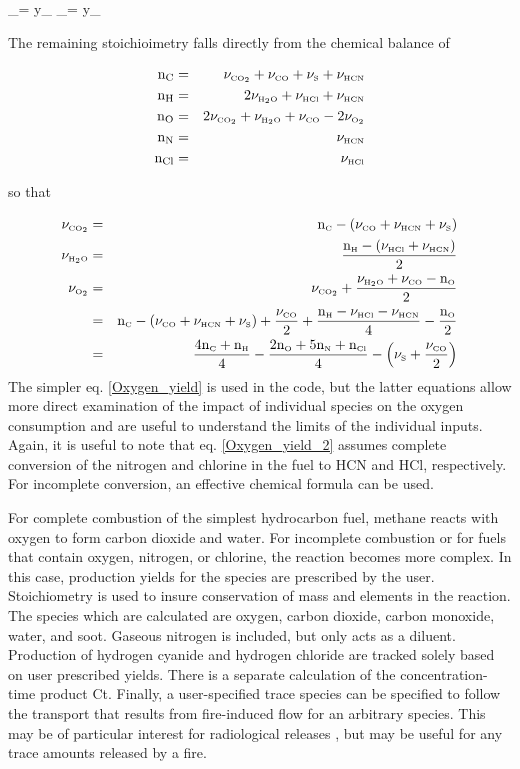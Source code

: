 \be
   \nu_\HCN =  \; y_\HCN \label{HCN_yield}
\ee
\be
   \nu_\HCl =  \; y_\HCl \label{HCl_yield}
\ee

The remaining stoichioimetry falls directly from the chemical balance of

\begin{eqnarray}
\mathrm{n_C} &=& \nu_{\tiny \hbox{CO}_2} + \nu_{\tiny \hbox{CO}} + \nu_{\tiny \hbox{S}} + \nu_{\tiny \hbox{HCN}} \\
\mathrm{n_H} &=& 2 \nu_{\tiny \hbox{H}_2\hbox{O}} + \nu_{\tiny \hbox{HCl}} + \nu_{\tiny \hbox{HCN}} \\
\mathrm{n_O} &=& 2 \nu_{\tiny \hbox{CO}_2} + \nu_{\tiny \hbox{H}_2\hbox{O}} + \nu_{\tiny \hbox{CO}} - 2 \nu_{\tiny \hbox{O}_2} \\
\mathrm{n_{N}} &=& \nu_{\tiny \hbox{HCN}} \\
\mathrm{n_{Cl}} &=& \nu_{\tiny \hbox{HCl}}
\end{eqnarray}

so that

\begin{eqnarray}
  \nu_{\tiny \hbox{CO}_2} &=& \mathrm{n_{\tiny \hbox{C}}} - { \left( {\nu_{\tiny \hbox{CO}} + \nu_{\tiny \hbox{HCN}} + \nu_{\tiny \hbox{S}}} \right) } \\
  \nu_{\tiny \hbox{H}_2\hbox{O}} &=& \frac{\mathrm{n_{\tiny \hbox{H}}} - { \left( {\nu_{\tiny \hbox{HCl}} + \nu_{\tiny \hbox{HCN}}} \right) }}{2} \\
 \nu_{\tiny \hbox{O}_2} &=& \nu_{\tiny \hbox{CO}_2} + \frac{\nu_{\tiny \hbox{H}_2\hbox{O}} + \nu_{\tiny \hbox{CO}} - \mathrm{n_{\tiny \hbox{O}}}}{2} \label{Oxygen_yield} \\
 &=& \mathrm{n_{\tiny \hbox{C}}} - { \left( {\nu_{\tiny \hbox{CO}} + \nu_{\tiny \hbox{HCN}} + \nu_{\tiny \hbox{S}}} \right) }+\frac{\nu_{\tiny \hbox{CO}}}{2}+\frac{\mathrm{n_{\tiny \hbox{H}}} - \nu_{\tiny \hbox{HCl}} - \nu_{\tiny \hbox{HCN}}}{4}-\frac{\mathrm{n_{\tiny \hbox{O}}}}{2} \\
 &=& \frac{4 \mathrm{n_{\tiny \hbox{C}}+n_{\tiny \hbox{H}}}}{4}-\frac{\mathrm{2 n_{\tiny \hbox{O}}+5 n_{\tiny \hbox{N}}+n_{\tiny \hbox{Cl}}}}{4}-{ \left( {\nu_{\tiny \hbox{S}}+\frac{\nu_{\tiny \hbox{CO}}}{2}} \right) } \label{Oxygen_yield_2}
\end{eqnarray}
The simpler eq. \ref{Oxygen_yield} is used in the code, but the latter equations allow more direct examination of the impact of individual species on the oxygen consumption and are useful to understand the limits of the individual inputs. Again, it is useful to note that eq. \ref{Oxygen_yield_2} assumes complete conversion of the nitrogen and chlorine in the fuel to HCN and HCl, respectively. For incomplete conversion, an effective chemical formula can be used.

For complete combustion of the simplest hydrocarbon fuel, methane reacts with
oxygen to form carbon dioxide and water. For incomplete combustion or for fuels that contain oxygen, nitrogen, or chlorine, the reaction becomes
more complex. In this case, production yields for the species are prescribed by the user.
Stoichiometry is used to insure conservation of mass and elements in the reaction. The species
which are calculated are oxygen, carbon dioxide, carbon monoxide, water, and soot. Gaseous nitrogen is included, but only acts as a diluent. Production of hydrogen cyanide and hydrogen chloride are tracked solely based on user prescribed yields. There is a separate calculation of the concentration-time product Ct. Finally, a user-specified trace species can be specified to follow the transport that results from fire-induced flow for an arbitrary species. This may be of particular interest for radiological releases \cite{Jones:2008}, but may be useful for any trace amounts released by a fire.

